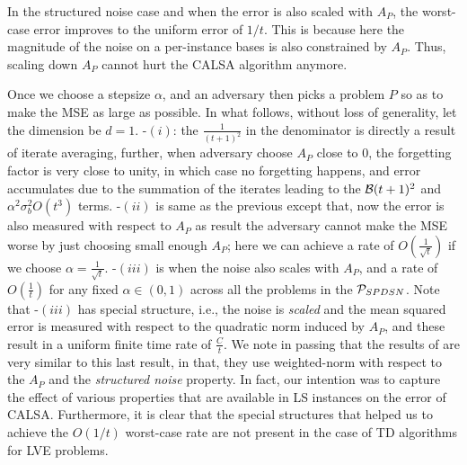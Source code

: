 In the structured noise case and when the error is also scaled with $A_P$, the worst-case error improves to 
the uniform error of $1/t$. This is because here the magnitude of the noise on a per-instance bases is also constrained
by $A_P$. Thus, scaling down $A_P$ cannot hurt the CALSA algorithm anymore.

\if
Once we choose a stepsize $\alpha$, and an adversary then picks a problem $P$ so as to make the MSE as large as possible.  In what follows, without loss of generality, let the dimension be $d=1$.
-$(i)$: the $\frac{1}{(t+1)^2}$ in the denominator is directly a result of iterate averaging,  further, when adversary choose $A_P$ close to $0$, the forgetting factor is very close to unity, in which case no forgetting happens, and error accumulates due to the summation of the iterates leading to the $\B(t+1)^2$ and $\alpha^2 \sigma_b^2 O(t^3)$ terms. -$(ii)$ is same as the previous except that, now the error is also measured with respect to $A_P$ as result the adversary cannot make the MSE worse by just choosing small enough $A_P$; here we can achieve a rate of $O(\frac{1}{\sqrt{t}})$ if we choose $\alpha=\frac{1}{\sqrt{t}}$. -$(iii)$ is when the noise also scales with $A_P$, and a rate of $O(\frac{1}{t})$ for any fixed $\alpha\in(0,1)$ across all the problems in the $\P_{SPDSN}$. Note that -$(iii)$ has special structure, i.e., the noise is \emph{scaled} and the mean squared error is measured with respect to the quadratic norm induced by $A_P$, and these result in a uniform finite time rate of $\frac{C}{t}$. 
\fi
We note in passing that the results of \citet{bach-moulines} are very similar to this last result, in that, they use weighted-norm with respect to the $A_P$ and the \emph{structured noise} property. 
In fact, our intention was to capture the effect of various properties that are available in LS instances on the error
of CALSA.
Furthermore, it is clear that the special structures that helped us to achieve the $O(1/t)$ worst-case rate
are not present in the case of TD algorithms for LVE problems.

